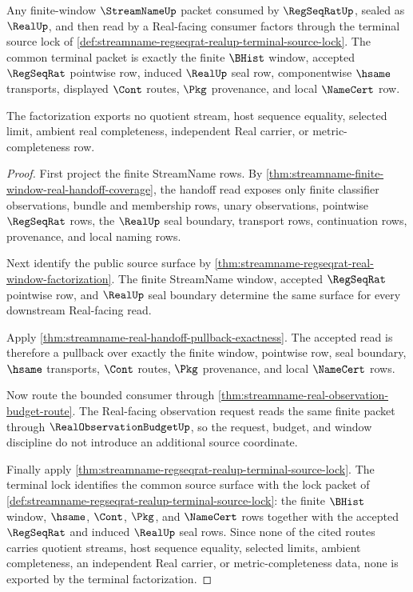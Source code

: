 \begin{theorem}
\label{thm:streamname-real-terminal-factorization}
Any finite-window $\StreamNameUp$ packet consumed by $\RegSeqRatUp$, sealed as $\RealUp$, and then read by a Real-facing consumer factors through the terminal source lock of \autoref{def:streamname-regseqrat-realup-terminal-source-lock}. The common terminal packet is exactly the finite $\BHist$ window, accepted $\RegSeqRat$ pointwise row, induced $\RealUp$ seal row, componentwise $\hsame$ transports, displayed $\Cont$ routes, $\Pkg$ provenance, and local $\NameCert$ row.

The factorization exports no quotient stream, host sequence equality, selected limit, ambient real completeness, independent Real carrier, or metric-completeness row.
\end{theorem}
\begin{proof}
First project the finite StreamName rows. By \autoref{thm:streamname-finite-window-real-handoff-coverage}, the handoff read exposes only finite classifier observations, bundle and membership rows, unary observations, pointwise $\RegSeqRat$ rows, the $\RealUp$ seal boundary, transport rows, continuation rows, provenance, and local naming rows.

Next identify the public source surface by \autoref{thm:streamname-regseqrat-real-window-factorization}. The finite StreamName window, accepted $\RegSeqRat$ pointwise row, and $\RealUp$ seal boundary determine the same surface for every downstream Real-facing read.

Apply \autoref{thm:streamname-real-handoff-pullback-exactness}. The accepted read is therefore a pullback over exactly the finite window, pointwise row, seal boundary, $\hsame$ transports, $\Cont$ routes, $\Pkg$ provenance, and local $\NameCert$ rows.

Now route the bounded consumer through \autoref{thm:streamname-real-observation-budget-route}. The Real-facing observation request reads the same finite packet through $\RealObservationBudgetUp$, so the request, budget, and window discipline do not introduce an additional source coordinate.

Finally apply \autoref{thm:streamname-regseqrat-realup-terminal-source-lock}. The terminal lock identifies the common source surface with the lock packet of \autoref{def:streamname-regseqrat-realup-terminal-source-lock}: the finite $\BHist$ window, $\hsame$, $\Cont$, $\Pkg$, and $\NameCert$ rows together with the accepted $\RegSeqRat$ and induced $\RealUp$ seal rows. Since none of the cited routes carries quotient streams, host sequence equality, selected limits, ambient completeness, an independent Real carrier, or metric-completeness data, none is exported by the terminal factorization.
\end{proof}

